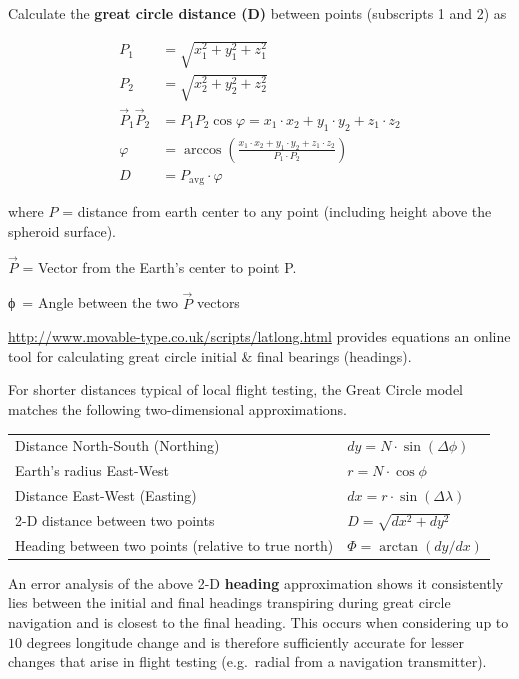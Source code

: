 \documentclass[
]{book}
\begin{document}
Calculate the \textbf{great circle distance (D)} between points (subscripts 1 and 2) as

\[
\begin{align}
P_{1} &= \sqrt{x_{1}^{2} + y_{1}^{2} + z_{1}^{2}} \\
P_{2} &= \sqrt{x_{2}^{2} + y_{2}^{2} + z_{2}^{2}} \\
\overset{\rightarrow}{P}_{1}  \overset{\rightarrow}P_{2} &= P_{1} P_{2}\cos{\varphi} = x_{1} \cdot x_{2} + y_{1} \cdot y_{2} + z_{1} \cdot z_{2} \\
\varphi &= \arccos\left( \frac{x_{1} \cdot x_{2} + y_{1} \cdot y_{2} + z_{1} \cdot z_{2}}{P_{1} \cdot P_{2}} \right) \\
D &= P_{\mathrm{avg}} \cdot \varphi
\end{align}
\]

where
\(P\) = distance from earth center to any point (including height above the spheroid surface).

\(\overset{\rightarrow}{P}\) = Vector from the Earth's center to point P.

ϕ~= Angle between the two \(\overset{\rightarrow}{P}\) vectors

\url{http://www.movable-type.co.uk/scripts/latlong.html} provides equations an online tool for calculating great circle initial \& final bearings (headings).

For shorter distances typical of local flight testing, the Great Circle model matches the following two-dimensional approximations.

\begin{longtable}[]{@{}ll@{}}
\toprule
\endhead
Distance North-South (Northing) & \(dy = N \cdot \sin\left( \Delta\phi \right)\)\tabularnewline
Earth's radius East-West & \(r = N \cdot \cos{\phi}\)\tabularnewline
Distance East-West (Easting) & \(dx = r \cdot \sin\left(\Delta\lambda\right)\)\tabularnewline
2-D distance between two points & \(D = \sqrt{dx^2 + dy^2}\)\tabularnewline
Heading between two points (relative to true north) & \(\Phi = \arctan \left( dy/dx \right)\)\tabularnewline
\bottomrule
\end{longtable}

An error analysis of the above 2-D \textbf{heading} approximation shows it consistently lies between the initial and final headings transpiring during great circle navigation and is closest to the final heading.
This occurs when considering up to \(10\) degrees longitude change and is therefore sufficiently accurate for lesser changes that arise in flight testing (e.g.~radial from a navigation transmitter).
\end{document}

